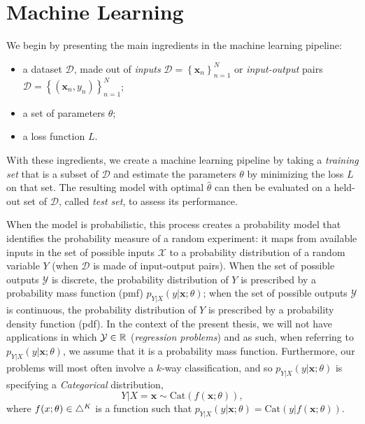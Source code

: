 \section{Machine Learning}
\label{sec:ml-primer}

\noindent We begin by presenting the main ingredients in the machine learning pipeline:
%
\begin{itemize}
    \item a dataset $\mathcal{D}$, made out of
          \textit{inputs} $\mathcal{D}=\left\{\bm{x}_n\right\}_{n=1}^N$ or
          \textit{input-output} pairs
          $\mathcal{D}=\left\{(\bm{x}_n,y_n)\right\}_{n=1}^N$;
    \item a set of parameters $\theta$;
    \item a loss function $L$.
\end{itemize}
%
With these ingredients, we create a machine learning pipeline by
taking a \textit{training set} that is a subset of $\mathcal{D}$ and estimate
the parameters $\theta$ by minimizing the loss
$L$ on that set. The resulting model with optimal
$\hat{\theta}$ can then be evaluated on a held-out set of
$\mathcal{D}$, called \textit{test set}, to assess its performance.

When the model is probabilistic, this process creates a probability
model that identifies the probability measure of a random experiment:
it maps from available inputs in the set of possible inputs
$\mathcal{X}$ to a probability distribution of a random variable $Y$
(when $\mathcal D$ is made of input-output pairs). When the set of
possible outputs $\mathcal{Y}$ is discrete, the probability
distribution of $Y$ is prescribed by a probability mass function
(pmf) $p_{Y|X}(y|\bm{x};\theta)$; when the set of possible outputs
$\mathcal{Y}$ is continuous, the probability distribution of $Y$ is
prescribed by a probability density function (pdf). In the context of
the present thesis, we will not have applications in which
$\mathcal{Y}\in\mathbb{R}$ (\ie \textit{regression problems}) and as
such, when referring to $p_{Y|X}(y|\bm{x};\theta)$, we assume that it is a
probability mass function. Furthermore, our problems will most often
involve a $k$-way classification, and so $p_{Y|X}(y|\bm{x};\theta)$ is
specifying a \textit{Categorical} distribution,
%
\begin{equation}
    Y|X\!\!=\!\bm{x} \sim \text{Cat}(f(\bm{x}; \theta)),
\end{equation}
%
where $f(x; \theta) \in \triangle^K$ is a function such that
$p_{Y|X}(y|\bm{x};\theta)=\text{Cat}(y|f(\bm{x}; \theta))$.

